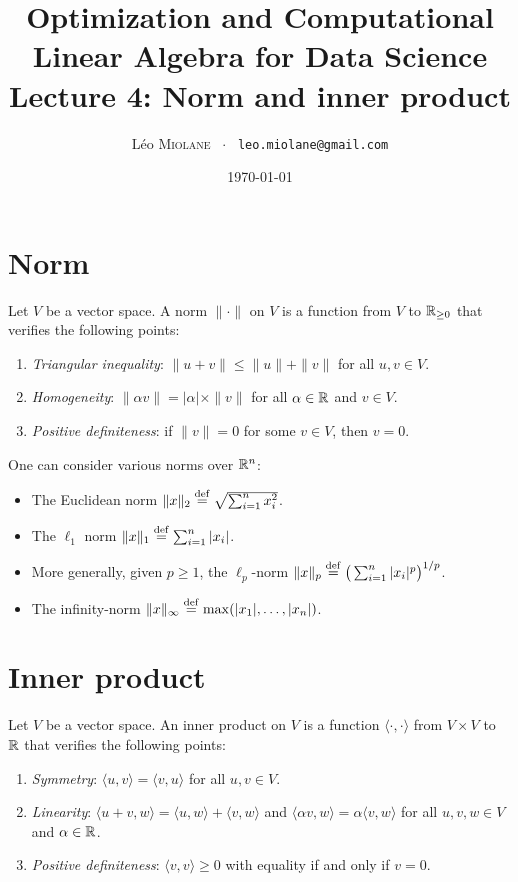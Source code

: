 \documentclass[11pt,nocut]{article}
\title{\vspace{-2.0cm}%
	Optimization and Computational Linear Algebra for Data Science\\
Lecture 4: Norm and inner product}
\author{Léo \textsc{Miolane} \ $\cdot$ \ \texttt{leo.miolane@gmail.com}}
\date{\today}
\begin{document}
\maketitle


\section{Norm}

\begin{definition}[Norm]
	Let $V$ be a vector space.
	A norm $\| \cdot \|$ on $V$ is a function from $V$ to $\mathbb{R}_{\geq 0}$ that verifies the following points:
	\begin{enumerate}[label=(\roman*)]
		\item \emph{Triangular inequality}: $\|u + v\| \leq \|u\| + \|v\|$ for all $u,v \in V$.
		\item \emph{Homogeneity}: $\| \alpha v \| = |\alpha|\times \| v\|$ for all $\alpha \in \mathbb{R}$ and  $v \in V$.
		\item \emph{Positive definiteness}: if $\|v\| = 0$ for some $v \in V$, then $v=0$.
	\end{enumerate}
\end{definition}

\begin{example}
	One can consider various norms over $\mathbb{R}^n$:
	\begin{itemize}
		\item The Euclidean norm $\|x\|_2 \overset{\rm def}{=} \sqrt{\sum_{i=1}^n x_i^2}$.
		\item The $\ell_1$ norm $\|x\|_1 \overset{\rm def}{=} \sum_{i=1}^n |x_i|$.
		\item More generally, given $p \geq 1$, the $\ell_p$-norm $\|x\|_p \overset{\rm def}{=} \big(\sum_{i=1}^n |x_i|^p \big)^{1/p}$.
		\item The infinity-norm $\|x \|_{\infty} \overset{\rm def}{=} \max(|x_1|, \dots, |x_n|)$.
	\end{itemize}
\end{example}


\section{Inner product}

\begin{definition}
	Let $V$ be a vector space.
	An inner product on $V$ is a function $\langle \cdot, \cdot \rangle$ from $V \times V$ to $\mathbb{R}$ that verifies the following points:
	\begin{enumerate}[label=(\roman*)]
		\item \emph{Symmetry}: $\langle u, v \rangle = \langle v, u\rangle$ for all $u,v \in V$.
		\item \emph{Linearity}: $\langle u+v, w \rangle = \langle u, w\rangle + \langle v, w\rangle$ and $\langle \alpha v, w \rangle = \alpha \langle v, w \rangle$ for all $u,v,w \in V$ and $\alpha \in \mathbb{R}$.
		\item \emph{Positive definiteness}: $\langle v, v\rangle \geq 0$ with equality if and only if $v = 0$.
	\end{enumerate}
\end{definition}
\end{document}
